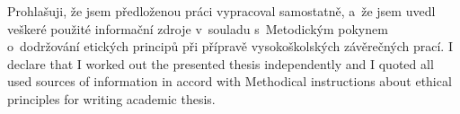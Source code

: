 \startDeclaration
\ifCzech
  Prohlašuji, že jsem předloženou práci vypracoval samostatně,
  a~že jsem uvedl veškeré použité informační zdroje v~souladu
  s~Metodickým pokynem o~dodržování etických principů při přípravě
  vysokoškolských závěrečných prací.
\fi
\ifEnglish
  I declare that I worked out the presented thesis independently
  and I quoted all used sources of information in accord with
  Methodical instructions about ethical principles for writing
  academic thesis.
\fi
\stopDeclaration

\endinput
